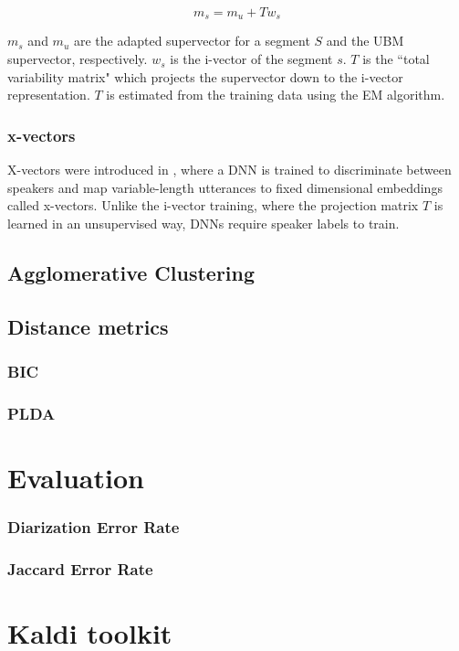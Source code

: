 		$$ m_s = m_u + Tw_s $$
		
		$m_s$ and $m_u$ are the adapted supervector for a segment $S$ and the UBM supervector, respectively. $w_s$ is the i-vector of the segment $s$. $T$ is the ``total variability matrix" which projects the supervector down to the i-vector representation. $T$ is estimated from the training data using the EM algorithm.
		
		\subsubsection{x-vectors}
		X-vectors were introduced in \cite{snyder2018x}, where a DNN is trained to discriminate between speakers and map variable-length utterances to fixed dimensional embeddings called x-vectors. Unlike the i-vector training, where the projection matrix $T$ is learned in an unsupervised way, DNNs require speaker labels to train.
				
	\subsection{Agglomerative Clustering}

	\subsection{Distance metrics}
		
		\subsubsection{BIC}
		\subsubsection{PLDA}

\section{Evaluation}

	\subsubsection{Diarization Error Rate}
	\subsubsection{Jaccard Error Rate}

\section{Kaldi toolkit}
